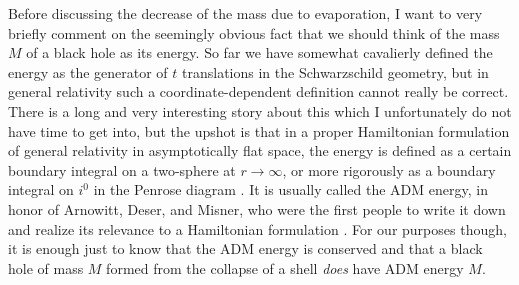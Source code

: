\documentclass[12pt]{article}
\begin{document}
Before discussing the decrease of the mass due to evaporation, I want to very briefly comment on the seemingly obvious fact that we should think of the mass $M$ of a black hole as its energy.  So far we have somewhat cavalierly defined the energy as the generator of $t$ translations in the Schwarzschild geometry, but in general relativity such a coordinate-dependent definition cannot really be correct.  There is a long and very interesting story about this which I unfortunately do not have time to get into, but the upshot is that in a proper Hamiltonian formulation of general relativity in asymptotically flat space, the energy is defined as a certain boundary integral on a two-sphere at $r\to\infty$, or more rigorously as a boundary integral on $i^0$ in the Penrose diagram \cite{Regge:1974zd}.  It is usually called the ADM energy, in honor of Arnowitt, Deser, and Misner, who were the first people to write it down and realize its relevance to a Hamiltonian formulation \cite{Arnowitt:1962hi}.  For our purposes though, it is enough just to know that the ADM energy is conserved and that a black hole of mass $M$ formed from the collapse of a shell \textit{does} have ADM energy $M$. 
\end{document}
